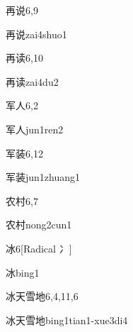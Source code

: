 \begin{entry}{再说}{6,9}
  \begin{phonetics}{再说}{zai4shuo1}
  \end{phonetics}
\end{entry}

\begin{entry}{再读}{6,10}
  \begin{phonetics}{再读}{zai4du2}
  \end{phonetics}
\end{entry}

\begin{entry}{军人}{6,2}
  \begin{phonetics}{军人}{jun1ren2}
  \end{phonetics}
\end{entry}

\begin{entry}{军装}{6,12}
  \begin{phonetics}{军装}{jun1zhuang1}
  \end{phonetics}
\end{entry}

\begin{entry}{农村}{6,7}
  \begin{phonetics}{农村}{nong2cun1}
  \end{phonetics}
\end{entry}

\begin{entry}{冰}{6}[Radical 冫]
  \begin{phonetics}{冰}{bing1}
  \end{phonetics}
\end{entry}

\begin{entry}{冰天雪地}{6,4,11,6}
  \begin{phonetics}{冰天雪地}{bing1tian1-xue3di4}
  \end{phonetics}
\end{entry}

